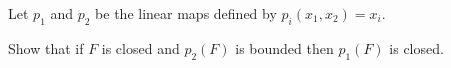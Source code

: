 Let $p_1$ and $p_2$ be the linear maps defined by $p_i(x_1, x_2) = x_i$.

Show that if $F$ is closed and $p_2(F)$ is bounded then $p_1(F)$ is closed.

